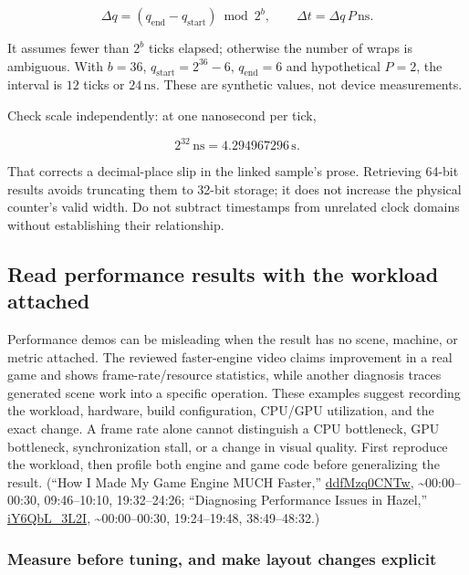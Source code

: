 \[
\Delta q=(q_{\mathrm{end}}-q_{\mathrm{start}})\bmod2^b,
\qquad
\Delta t=\Delta q\,P\,\mathrm{ns}.
\]

It assumes fewer than \(2^b\) ticks elapsed; otherwise the number of wraps is ambiguous. With \(b=36\), \(q_{\mathrm{start}}=2^{36}-6\), \(q_{\mathrm{end}}=6\) and hypothetical \(P=2\), the interval is \(12\) ticks or \(24\,\mathrm{ns}\). These are synthetic values, not device measurements.

Check scale independently: at one nanosecond per tick,

\[2^{32}\,\mathrm{ns}=4.294967296\,\mathrm{s}.\]

That corrects a decimal-place slip in the linked sample's prose. Retrieving 64-bit results avoids truncating them to 32-bit storage; it does not increase the physical counter's valid width. Do not subtract timestamps from unrelated clock domains without establishing their relationship.

\subsection{Read performance results with the workload attached}\label{06-engine-ii-ch041-read-performance-results-with-the-workload-attached}

\hypertarget{06-engine-ii-ch041-read-performance-results-with-the-workload-attached}{}

Performance demos can be misleading when the result has no scene, machine, or metric attached. The reviewed faster-engine video claims improvement in a real game and shows frame-rate/resource statistics, while another diagnosis traces generated scene work into a specific operation. These examples suggest recording the workload, hardware, build configuration, CPU/GPU utilization, and the exact change. A frame rate alone cannot distinguish a CPU bottleneck, GPU bottleneck, synchronization stall, or a change in visual quality. First reproduce the workload, then profile both engine and game code before generalizing the result. (``How I Made My Game Engine MUCH Faster,'' \href{https://www.youtube.com/watch?v=ddfMzq0CNTw}{ddfMzq0CNTw}, \textasciitilde00:00--00:30, 09:46--10:10, 19:32--24:26; ``Diagnosing Performance Issues in Hazel,'' \href{https://www.youtube.com/watch?v=iY6QbL_3L2I}{iY6QbL\_3L2I}, \textasciitilde00:00--00:30, 19:24--19:48, 38:49--48:32.)

\subsubsection{Measure before tuning, and make layout changes explicit}\label{06-engine-ii-ch041-measure-before-tuning-and-make-layout-changes-explicit}

